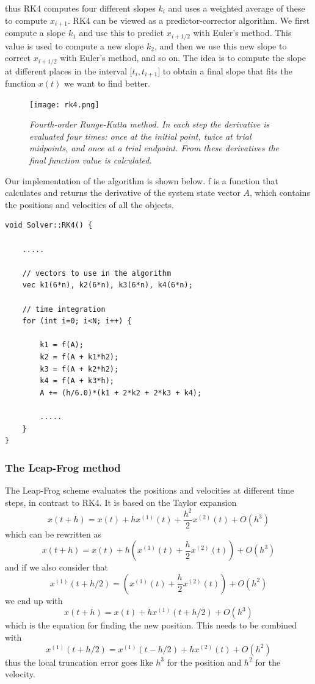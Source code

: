 \documentclass[a4paper,12pt, english]{article}
\begin{document}
thus RK4 computes four different slopes $k_i$ and uses a weighted average of these to compute $x_{i+1}$. RK4 can be viewed as a predictor-corrector algorithm. We first compute a slope $k_1$ and use this to predict $x_{i+1/2}$ with Euler's method. This value is used to compute a new slope $k_2$, and then we use this new slope to correct $x_{i+1/2}$ with Euler's method, and so on. The idea is to compute the slope at different places in the interval $\lbrack t_i,t_{i+1} \rbrack$ to obtain a final slope that fits the function $x(t)$ we want to find better.

\begin{figure}[H]
  \centering \texttt{[image: rk4.png]}
  \caption{\textit{Fourth-order Runge-Kutta method. In each step the derivative is evaluated four times:
once at the initial point, twice at trial midpoints, and once at a trial endpoint. From these derivatives the
final function value is calculated. }}
\end{figure}

\lstset{
  basicstyle=\small\ttfamily,
  frame=lrtb,
  numbers=left
}

Our implementation of the algorithm is shown below. f is a function that calculates and returns the derivative of the system state vector $A$, which contains the positions and velocities of all the objects.

\begin{lstlisting}[title={Function RK4}]
void Solver::RK4() {

    .....

    // vectors to use in the algorithm
    vec k1(6*n), k2(6*n), k3(6*n), k4(6*n);
 
    // time integration
    for (int i=0; i<N; i++) {

        k1 = f(A);
        k2 = f(A + k1*h2);
        k3 = f(A + k2*h2);
        k4 = f(A + k3*h);
        A += (h/6.0)*(k1 + 2*k2 + 2*k3 + k4);  
        
        .....         
    }
}
\end{lstlisting}



\subsubsection*{The Leap-Frog method}

The Leap-Frog scheme evaluates the positions and velocities at different time steps, in contrast to RK4. It is based on the Taylor expansion
\[
x(t+h) = x(t) + hx^{(1)}(t) + \frac{h^2}{2}x^{(2)}(t) + O(h^3)
\]
which can be rewritten as
\[
x(t+h) = x(t) + h \left( x^{(1)}(t) + \frac{h}{2}x^{(2)}(t) \right) + O(h^3)
\]
and if we also consider that
\[
x^{(1)}(t+h/2) = \left( x^{(1)}(t) + \frac{h}{2}x^{(2)}(t) \right) + O(h^2)
\]
we end up with
\[
x(t+h) = x(t) + hx^{(1)}(t+h/2) + O(h^3) \tag{1}
\]
which is the equation for finding the new position. This needs to be combined with
\[
x^{(1)}(t+h/2) = x^{(1)}(t-h/2) + hx^{(2)}(t) + O(h^2) \tag{2}
\]
thus the local truncation error goes like $h^3$ for the position and $h^2$ for the velocity.
\end{document}
